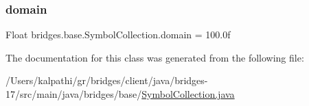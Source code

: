 \subsubsection{\texorpdfstring{domain}{domain}}
{\footnotesize\ttfamily Float bridges.\+base.\+Symbol\+Collection.\+domain = 100.\+0f\hspace{0.3cm}{\ttfamily [protected]}}



The documentation for this class was generated from the following file\+:\begin{DoxyCompactItemize}
\item 
/\+Users/kalpathi/gr/bridges/client/java/bridges-\/17/src/main/java/bridges/base/\mbox{\hyperlink{_symbol_collection_8java}{Symbol\+Collection.\+java}}\end{DoxyCompactItemize}
